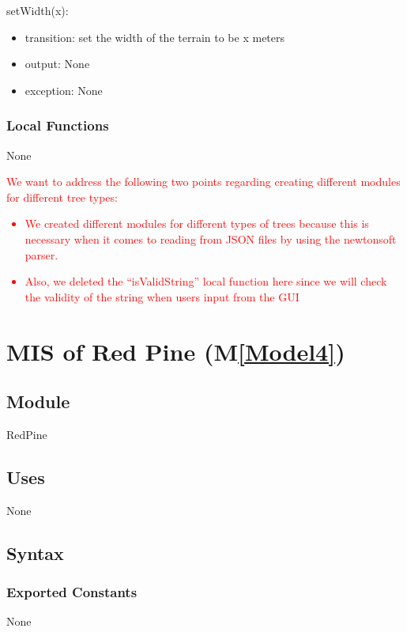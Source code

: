 \documentclass[12pt, titlepage]{article}
\newcommand{\mref}[1]{M\ref{#1}}
\begin{document}
\noindent setWidth(x):
\begin{itemize}
\item transition: set the width of the terrain to be x meters
\item output: None
\item exception: None
\end{itemize}

\subsubsection{Local Functions}
None

\newpage

\noindent 
\textcolor{red}{
We want to address the following two points regarding creating 
different modules for different tree types:
\begin{itemize}
\item We created different modules for different types of 
trees because this is necessary when it comes to reading from 
JSON files by using the newtonsoft parser.
\item Also, we deleted
the ``isValidString'' local function here since we will check the validity 
of the string when users input from the GUI
\end{itemize}}


\newcommand{\tn}{Red Pine }
\newcommand{\tmn}{RedPine}
\newcommand{\constn}{Red\ Pine}

\section{MIS of \tn (\mref{Model4})}

\subsection{Module}
\tmn

\subsection{Uses}
None

\subsection{Syntax}
\subsubsection{Exported Constants}
None
\end{document}
